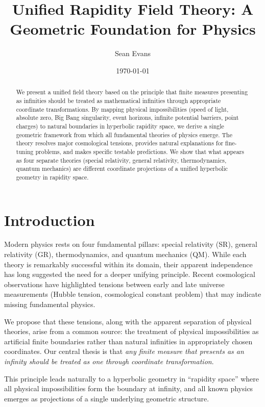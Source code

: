 \documentclass[12pt,a4paper]{article}
\title{Unified Rapidity Field Theory: A Geometric Foundation for Physics}
\author{Sean Evans}
\date{\today}
\begin{document}
\maketitle

\begin{abstract}
We present a unified field theory based on the principle that finite measures 
presenting as infinities should be treated as mathematical infinities through 
appropriate coordinate transformations. By mapping physical impossibilities 
(speed of light, absolute zero, Big Bang singularity, event horizons, infinite 
potential barriers, point charges) to natural boundaries in hyperbolic rapidity 
space, we derive a single geometric framework from which all fundamental 
theories of physics emerge. The theory resolves major cosmological tensions, 
provides natural explanations for fine-tuning problems, and makes specific 
testable predictions. We show that what appears as four separate theories 
(special relativity, general relativity, thermodynamics, quantum mechanics) are 
different coordinate projections of a unified hyperbolic geometry in rapidity 
space.
\end{abstract}

\section{Introduction}

Modern physics rests on four fundamental pillars: special relativity (SR), 
general relativity (GR), thermodynamics, and quantum mechanics (QM). While each 
theory is remarkably successful within its domain, their apparent independence 
has long suggested the need for a deeper unifying principle. Recent cosmological 
observations have highlighted tensions between early and late universe 
measurements (Hubble tension, cosmological constant problem) that may indicate 
missing fundamental physics.

We propose that these tensions, along with the apparent separation of physical 
theories, arise from a common source: the treatment of physical impossibilities 
as artificial finite boundaries rather than natural infinities in appropriately 
chosen coordinates. Our central thesis is that \textit{any finite measure that 
presents as an infinity should be treated as one through coordinate transformation}.

This principle leads naturally to a hyperbolic geometry in ``rapidity space'' 
where all physical impossibilities form the boundary at infinity, and all known 
physics emerges as projections of a single underlying geometric structure.
\end{document}

